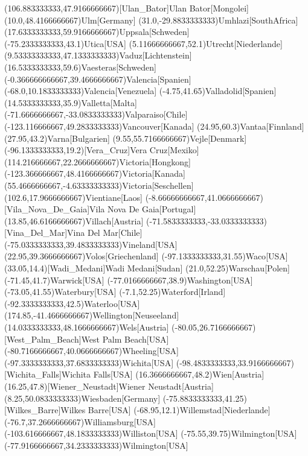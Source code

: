 \mapput(106.883333333,47.9166666667)[Ulan_Bator]{Ulan Bator}[Mongolei]
\mapput(10.0,48.4166666667){Ulm}[Germany]
\mapput(31.0,-29.8833333333){Umhlazi}[SouthAfrica]
\mapput(17.6333333333,59.9166666667){Uppsala}[Schweden]
\mapput(-75.2333333333,43.1){Utica}[USA]
\mapput(5.11666666667,52.1){Utrecht}[Niederlande]
\mapput(9.53333333333,47.1333333333){Vaduz}[Lichtenstein]
\mapput(16.5333333333,59.6){Vaesteras}[Schweden]
\mapput(-0.366666666667,39.4666666667){Valencia}[Spanien]
\mapput(-68.0,10.1833333333){Valencia}[Venezuela]
\mapput(-4.75,41.65){Valladolid}[Spanien]
\mapput(14.5333333333,35.9){Valletta}[Malta]
\mapput(-71.6666666667,-33.0833333333){Valparaiso}[Chile]
\mapput(-123.116666667,49.2833333333){Vancouver}[Kanada]
\mapput(24.95,60.3){Vantaa}[Finnland]
\mapput(27.95,43.2){Varna}[Bulgarien]
\mapput(9.55,55.7166666667){Vejle}[Denmark]
\mapput(-96.1333333333,19.2)[Vera_Cruz]{Vera Cruz}[Mexiko]
\mapput(114.216666667,22.2666666667){Victoria}[Hongkong]
\mapput(-123.366666667,48.4166666667){Victoria}[Kanada]
\mapput(55.4666666667,-4.63333333333){Victoria}[Seschellen]
\mapput(102.6,17.9666666667){Vientiane}[Laos]
\mapput(-8.66666666667,41.0666666667)[Vila_Nova_De_Gaia]{Vila Nova De Gaia}[Portugal]
\mapput(13.85,46.6166666667){Villach}[Austria]
\mapput(-71.5833333333,-33.0333333333)[Vina_Del_Mar]{Vina Del Mar}[Chile]
\mapput(-75.0333333333,39.4833333333){Vineland}[USA]
\mapput(22.95,39.3666666667){Volos}[Griechenland]
\mapput(-97.1333333333,31.55){Waco}[USA]
\mapput(33.05,14.4)[Wadi_Medani]{Wadi Medani}[Sudan]
\mapput(21.0,52.25){Warschau}[Polen]
\mapput(-71.45,41.7){Warwick}[USA]
\mapput(-77.0166666667,38.9){Washington}[USA]
\mapput(-73.05,41.55){Waterbury}[USA]
\mapput(-7.1,52.25){Waterford}[Irland]
\mapput(-92.3333333333,42.5){Waterloo}[USA]
\mapput(174.85,-41.4666666667){Wellington}[Neuseeland]
\mapput(14.0333333333,48.1666666667){Wels}[Austria]
\mapput(-80.05,26.7166666667)[West_Palm_Beach]{West Palm Beach}[USA]
\mapput(-80.7166666667,40.0666666667){Wheeling}[USA]
\mapput(-97.3333333333,37.6833333333){Wichita}[USA]
\mapput(-98.4833333333,33.9166666667)[Wichita_Falls]{Wichita Falls}[USA]
\mapput(16.3666666667,48.2){Wien}[Austria]
\mapput(16.25,47.8)[Wiener_Neustadt]{Wiener Neustadt}[Austria]
\mapput(8.25,50.0833333333){Wiesbaden}[Germany]
\mapput(-75.8833333333,41.25)[Wilkes_Barre]{Wilkes Barre}[USA]
\mapput(-68.95,12.1){Willemstad}[Niederlande]
\mapput(-76.7,37.2666666667){Williamsburg}[USA]
\mapput(-103.616666667,48.1833333333){Williston}[USA]
\mapput(-75.55,39.75){Wilmington}[USA]
\mapput(-77.9166666667,34.2333333333){Wilmington}[USA]
